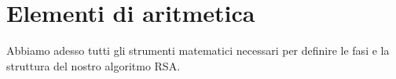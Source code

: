 \section{Elementi di aritmetica}







Abbiamo adesso tutti gli strumenti matematici necessari per definire le fasi e la struttura del nostro algoritmo RSA.